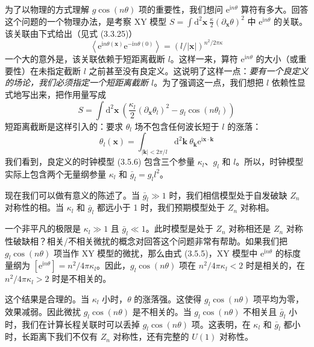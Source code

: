 为了以物理的方式理解 $g\cos(n\theta)$ 项的重要性，我们想问 $\mathrm{e}^{\mathrm{i}n\theta}$ 算符有多大。回答这个问题的一个物理办法，是考察 XY 模型 $S = \int \mathrm{d}^{2}\pmb{x}\ \frac{\kappa}{2}(\partial_{\pmb{x}}\theta)^{2}$ 中 $\mathrm{e}^{\mathrm{i}n\theta}$ 的关联。该关联由下式给出（见式 (3.3.25)）
\begin{equation*}
\left\langle \mathrm{e}^{\mathrm{i}n\theta(\pmb{x})}\mathrm{e}^{-\mathrm{i}n\theta(0)} \right\rangle = (l/|\pmb{x}|)^{n^{2}/2\pi\kappa}
\tag{3.5.5}
\end{equation*}
一个大的意外是，该关联依赖于短距离截断 $l$。这样一来，算符 $\mathrm{e}^{\mathrm{i}n\theta}$ 的大小（或重要性）在未指定截断 $l$ 之前甚至没有良定义。这说明了这样一点：\emph{要有一个良定义的场论，我们必须指定一个短距离截断 $l$}。为了强调这一点，我们想把 $l$ 依赖性显式地写出来，把作用量写成
\begin{equation*}
S = \int \mathrm{d}^{2}\pmb{x}\ \left( \frac{\kappa_{l}}{2}(\partial_{\pmb{x}}\theta_{l})^{2} - g_{l}\cos(n\theta_{l}) \right)
\tag{3.5.6}
\end{equation*}
短距离截断是这样引入的：要求 $\theta_{l}$ 场不包含任何波长短于 $l$ 的涨落：
\begin{equation*}
\theta_{l}(\pmb{x}) = \int_{|\pmb{k}|<2\pi/l} \mathrm{d}^{2}\pmb{k}\ \theta_{\pmb{k}}\mathrm{e}^{\mathrm{i}\pmb{x}\cdot\pmb{k}}
\end{equation*}
我们看到，良定义的时钟模型 (3.5.6) 包含三个参量 $\kappa_{l}$、$g_{l}$ 和 $l$。所以，时钟模型实际上包含两个无量纲参量 $\kappa_{l}$ 和 $\bar{g}_{l} = g_{l}l^{2}$。

现在我们可以做有意义的陈述了。当 $\bar{g}_{l} \gg 1$ 时，我们相信模型处于自发破缺 $Z_{n}$ 对称性的相。当 $\kappa_{l}$ 和 $\bar{g}_{l}$ 都远小于 1 时，我们预期模型处于 $Z_{n}$ 对称相。

一个非平凡的极限是 $\kappa_{l} \gg 1$ 且 $\bar{g}_{l} \ll 1$。此时模型是处于 $Z_{n}$ 对称相还是 $Z_{n}$ 对称性破缺相？相关/不相关微扰的概念对回答这个问题非常有帮助。如果我们把 $g_{l}\cos(n\theta)$ 项当作 XY 模型的微扰，那么由式 (3.5.5)，XY 模型中 $\mathrm{e}^{\mathrm{i}n\theta}$ 的标度量纲为 $[\mathrm{e}^{\mathrm{i}n\theta}] = n^{2}/4\pi\kappa_{l}$。因此，$g_{l}\cos(n\theta)$ 项在 $n^{2}/4\pi\kappa_{l} < 2$ 时是相关的，在 $n^{2}/4\pi\kappa_{l} > 2$ 时是不相关的。

这个结果是合理的。当 $\kappa_{l}$ 小时，$\theta$ 的涨落强。这使得 $g_{l}\cos(n\theta)$ 项平均为零，效果减弱。因此微扰 $g_{l}\cos(n\theta)$ 是不相关的。当 $g_{l}\cos(n\theta)$ 不相关且 $\bar{g}_{l}$ 小时，我们在计算长程关联时可以丢掉 $g_{l}\cos(n\theta)$ 项。这表明，在 $\kappa_{l}$ 和 $\bar{g}_{l}$ 都小时，长距离下我们不仅有 $Z_{n}$ 对称性，还有完整的 $U(1)$ 对称性。

